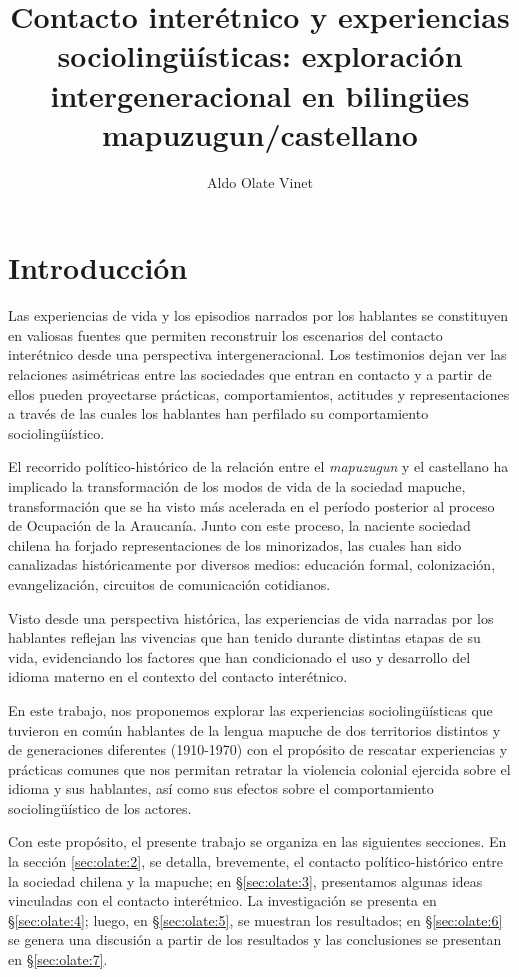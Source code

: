 \documentclass[output=paper]{../langscibook}
\author{Aldo Olate Vinet\orcid{0000-0002-6926-769X}\affiliation{Universidad de La Frontera}}
\title{Contacto interétnico y experiencias sociolingüísticas: exploración intergeneracional en bilingües mapuzugun/castellano}
\begin{document}
\maketitle 
{}
\clearpage




\section{Introducción}\label{sec:olate:1}


Las experiencias de vida y los episodios narrados por los hablantes se constituyen en valiosas fuentes que permiten reconstruir los escenarios del contacto interétnico desde una perspectiva intergeneracional. Los testimonios dejan ver las relaciones asimétricas entre las sociedades que entran en contacto y a partir de ellos pueden proyectarse prácticas, comportamientos, actitudes y representaciones a través de las cuales los hablantes han perfilado su comportamiento sociolingüístico. 

El recorrido político-histórico de la relación entre el \textit{mapuzugun} y el castellano ha implicado la transformación de los modos de vida de la sociedad mapuche, transformación que se ha visto más acelerada en el período posterior al proceso de Ocupación de la Araucanía. Junto con este proceso, la naciente sociedad chilena ha forjado representaciones de los minorizados, las cuales han sido canalizadas históricamente por diversos medios: educación formal, colonización, evangelización, circuitos de comunicación cotidianos. 

Visto desde una perspectiva histórica, las experiencias de vida narradas por los hablantes reflejan las vivencias que han tenido durante distintas etapas de su vida, evidenciando los factores que han condicionado el uso y desarrollo del idioma materno en el contexto del contacto interétnico. 

En este trabajo, nos proponemos explorar las experiencias sociolingüísticas que tuvieron en común hablantes de la lengua mapuche de dos territorios distintos y de generaciones diferentes (1910-1970) con el propósito de rescatar experiencias y prácticas comunes que nos permitan retratar la violencia colonial ejercida sobre el idioma y sus hablantes, así como sus efectos sobre el comportamiento sociolingüístico de los actores. 

Con este propósito, el presente trabajo se organiza en las siguientes secciones. En la sección \ref{sec:olate:2}, se detalla, brevemente, el contacto político-histórico entre la sociedad chilena y la mapuche;
en §\ref{sec:olate:3}, presentamos algunas ideas vinculadas con el contacto interétnico.
La investigación se presenta en §\ref{sec:olate:4};
luego, en §\ref{sec:olate:5}, se muestran los resultados;
en §\ref{sec:olate:6} se genera una discusión a partir de los resultados y las conclusiones se presentan en §\ref{sec:olate:7}.
\end{document}
